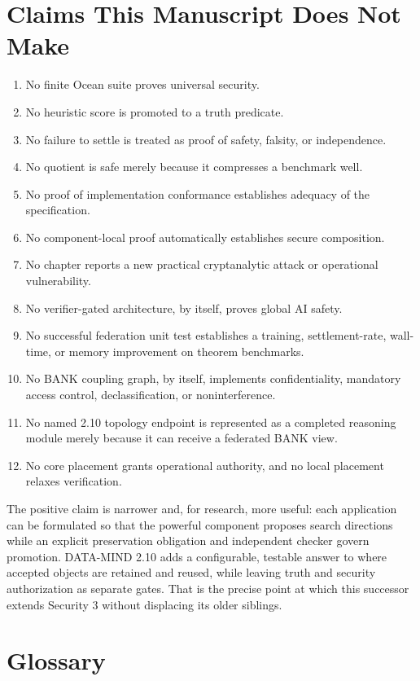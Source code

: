 \documentclass[11pt,oneside]{book}
\theoremstyle{definition}
\theoremstyle{remark}
\begin{document}
\chapter{Claims This Manuscript Does Not Make}

\begin{enumerate}[leftmargin=*]
\item No finite Ocean suite proves universal security.
\item No heuristic score is promoted to a truth predicate.
\item No failure to settle is treated as proof of safety, falsity, or independence.
\item No quotient is safe merely because it compresses a benchmark well.
\item No proof of implementation conformance establishes adequacy of the specification.
\item No component-local proof automatically establishes secure composition.
\item No chapter reports a new practical cryptanalytic attack or operational vulnerability.
\item No verifier-gated architecture, by itself, proves global AI safety.
\item No successful federation unit test establishes a training, settlement-rate, wall-time, or
memory improvement on theorem benchmarks.
\item No BANK coupling graph, by itself, implements confidentiality, mandatory access control,
declassification, or noninterference.
\item No named 2.10 topology endpoint is represented as a completed reasoning module merely because
it can receive a federated BANK view.
\item No core placement grants operational authority, and no local placement relaxes verification.
\end{enumerate}

The positive claim is narrower and, for research, more useful: each application can be formulated so
that the powerful component proposes search directions while an explicit preservation obligation and
independent checker govern promotion. DATA-MIND 2.10 adds a configurable, testable answer to where
accepted objects are retained and reused, while leaving truth and security authorization as separate
gates. That is the precise point at which this successor extends Security 3 without displacing its
older siblings.

\appendix
\chapter{Glossary}
\end{document}
